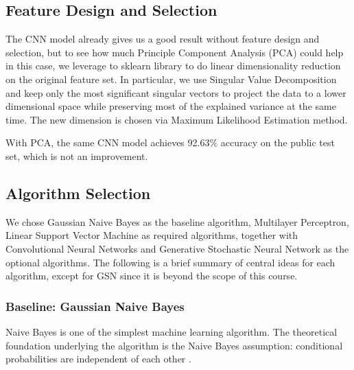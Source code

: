 \documentclass{acm_proc_article-sp}
\begin{document}
\subsection{Feature Design and Selection}
The CNN model already gives us a good result without feature design and selection, but to see how much Principle Component Analysis (PCA) could help in this case, we leverage to sklearn library to do linear dimensionality reduction on the original feature set. In particular, we use Singular Value Decomposition and keep only the most significant singular vectors to project the data to a lower dimensional space while preserving most of the explained variance at the same time. The new dimension is chosen via Maximum Likelihood Estimation method.

With PCA, the same CNN model achieves 92.63$\%$ accuracy on the public test set, which is not an improvement.


 
\subsection{Algorithm Selection}
We chose Gaussian Naive Bayes as the baseline algorithm, Multilayer Perceptron, Linear Support Vector Machine as required algorithms, together with Convolutional Neural Networks and Generative Stochastic Neural Network as the optional algorithms. The following is a brief summary of central ideas for each algorithm, except for GSN since it is beyond the scope of this course.

\subsubsection{Baseline: Gaussian Naive Bayes}
Naive Bayes is one of the simplest machine learning algorithm. The theoretical foundation underlying the algorithm is the Naive Bayes assumption: conditional probabilities are independent of each other \cite{Bishop:2006:PRM:1162264, pineaul5}.
\end{document}
